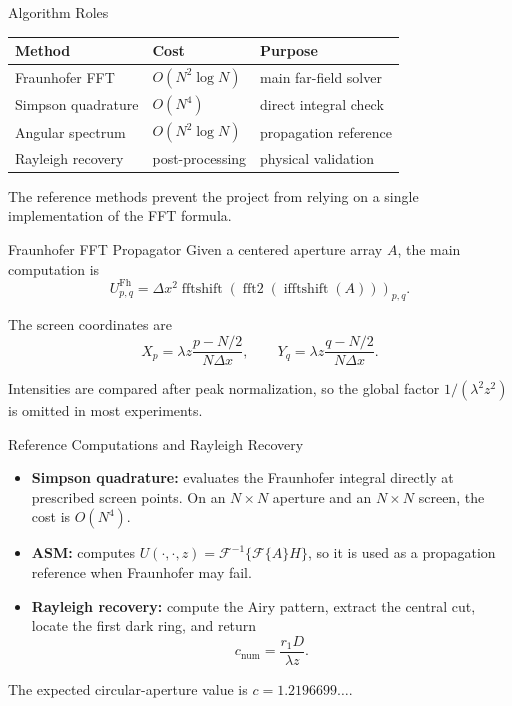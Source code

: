 \documentclass[aspectratio=169,11pt]{beamer}
\begin{document}
\begin{frame}{Algorithm Roles}
    \begin{center}
    \begin{tabular}{lll}
        \toprule
        Method & Cost & Purpose \\
        \midrule
        Fraunhofer FFT & \(O(N^2\log N)\) & main far-field solver \\
        Simpson quadrature & \(O(N^4)\) & direct integral check \\
        Angular spectrum & \(O(N^2\log N)\) & propagation reference \\
        Rayleigh recovery & post-processing & physical validation \\
        \bottomrule
    \end{tabular}
    \end{center}

    \vspace{0.2cm}
    The reference methods prevent the project from relying on a single implementation of the FFT formula.
\end{frame}

\begin{frame}{Fraunhofer FFT Propagator}
    Given a centered aperture array \(A\), the main computation is
    \[
        U^{\mathrm{Fh}}_{p,q}
        =
        \Delta x^2
        \operatorname{fftshift}\!\left(
            \operatorname{fft2}\!\left(\operatorname{ifftshift}(A)\right)
        \right)_{p,q}.
    \]

    \vspace{0.15cm}
    The screen coordinates are
    \[
        X_p=\lambda z\frac{p-N/2}{N\Delta x},\qquad
        Y_q=\lambda z\frac{q-N/2}{N\Delta x}.
    \]

    \vspace{0.15cm}
    Intensities are compared after peak normalization, so the global factor \(1/(\lambda^2 z^2)\) is
    omitted in most experiments.
\end{frame}

\begin{frame}{Reference Computations and Rayleigh Recovery}
    \begin{itemize}
        \item \textbf{Simpson quadrature:} evaluates the Fraunhofer integral directly at prescribed screen
              points. On an \(N\times N\) aperture and an \(N\times N\) screen, the cost is \(O(N^4)\).
        \item \textbf{ASM:} computes
              \(U(\cdot,\cdot,z)=\mathcal{F}^{-1}\{\mathcal{F}\{A\}H\}\), so it is used as a propagation
              reference when Fraunhofer may fail.
        \item \textbf{Rayleigh recovery:} compute the Airy pattern, extract the central cut, locate the
              first dark ring, and return
              \[
                  c_{\mathrm{num}}=\frac{r_1D}{\lambda z}.
              \]
    \end{itemize}

    \vspace{0.1cm}
    The expected circular-aperture value is \(c=1.2196699\ldots\).
\end{frame}
\end{document}
